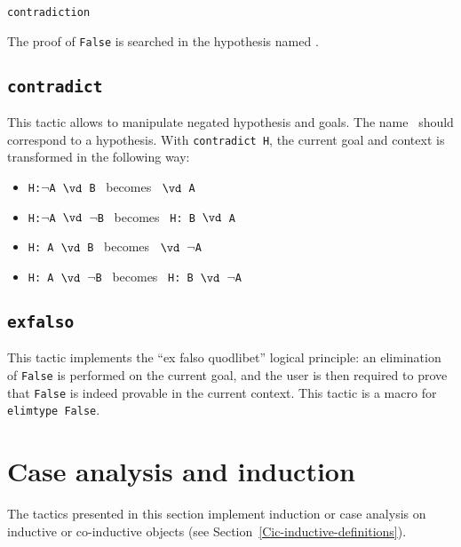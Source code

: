 \begin{coq_example*}
\begin{ErrMsgs}
\item {}
\end{ErrMsgs}

\begin{Variants}
\item {\tt contradiction \ident}

The proof of {\tt False} is searched in the hypothesis named \ident.
\end{Variants}

\subsection{\tt contradict \ident}
\label{contradict}

This tactic allows to manipulate negated hypothesis and goals. The
name \ident\ should correspond to a hypothesis. With
{\tt contradict H}, the current goal and context is transformed in
the following way:
\begin{itemize}
\item  {\tt H:$\neg$A $\vd$  B} \ becomes \ {\tt $\vd$ A}
\item  {\tt H:$\neg$A $\vd$ $\neg$B} \  becomes \ {\tt H: B $\vd$  A }
\item  {\tt H: A $\vd$  B} \ becomes \ {\tt $\vd$ $\neg$A}
\item  {\tt H: A $\vd$ $\neg$B} \ becomes \ {\tt H: B $\vd$ $\neg$A}
\end{itemize}

\subsection{\tt exfalso}
\label{exfalso}

This tactic implements the ``ex falso quodlibet'' logical principle:
an elimination of {\tt False} is performed on the current goal, and the
user is then required to prove that {\tt False} is indeed provable in
the current context. This tactic is a macro for {\tt elimtype False}.

\section{Case analysis and induction
\label{Tac-induction}}

The tactics presented in this section implement induction or case
analysis on inductive or co-inductive objects (see
Section~\ref{Cic-inductive-definitions}).


\end{coq_example*}
